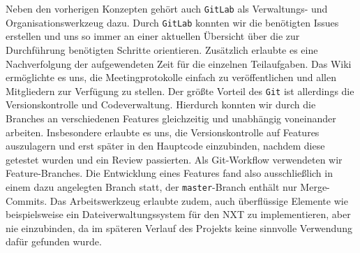 \documentclass[oneside,abstractoff,a4paper]{scrartcl}
\begin{document}
Neben den vorherigen Konzepten gehört auch \texttt{GitLab} als Verwaltungs- und Organisationswerkzeug dazu. Durch \texttt{GitLab} konnten wir die benötigten Issues erstellen und uns so immer an einer aktuellen Übersicht über die zur Durchführung benötigten Schritte orientieren. Zusätzlich erlaubte es eine Nachverfolgung der aufgewendeten Zeit für die einzelnen Teilaufgaben. Das Wiki ermöglichte es uns, die Meetingprotokolle einfach zu veröffentlichen und allen Mitgliedern zur Verfügung zu stellen. Der größte Vorteil des \texttt{Git} ist allerdings die Versionskontrolle und Codeverwaltung. Hierdurch konnten wir durch die Branches an verschiedenen Features gleichzeitig und unabhängig voneinander arbeiten. Insbesondere erlaubte es uns, die Versionskontrolle auf Features auszulagern und erst später in den Hauptcode einzubinden, nachdem diese getestet wurden und ein Review passierten. Als Git-Workflow verwendeten wir Feature-Branches. Die Entwicklung eines Features fand also ausschließlich in einem dazu angelegten Branch statt, der \texttt{master}-Branch enthält nur Merge-Commits. Das Arbeitswerkzeug erlaubte zudem, auch überflüssige Elemente wie beispielsweise ein Dateiverwaltungssystem für den NXT zu implementieren, aber nie einzubinden, da im späteren Verlauf des Projekts keine sinnvolle Verwendung dafür gefunden wurde.

\end{document}
